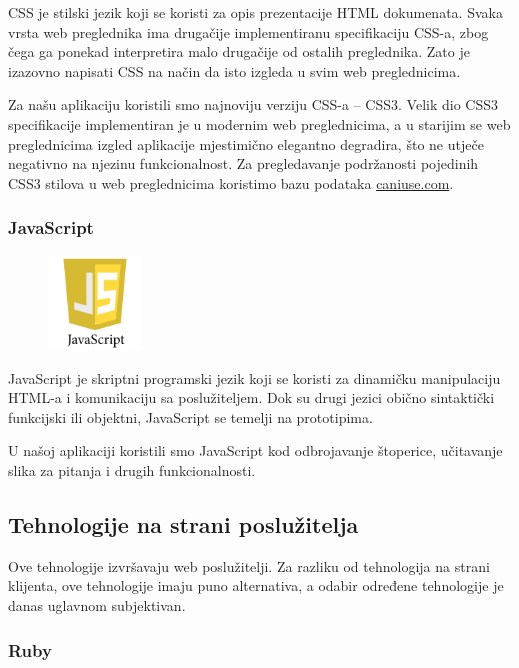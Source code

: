 \documentclass[11pt]{scrreprt}
\begin{document}
CSS je stilski jezik koji se koristi za opis prezentacije HTML dokumenata. Svaka
vrsta web preglednika ima drugačije implementiranu specifikaciju CSS-a, zbog
čega ga ponekad interpretira malo drugačije od ostalih preglednika. Zato je
izazovno napisati CSS na način da isto izgleda u svim web
preglednicima.\cite{css}

Za našu aplikaciju koristili smo najnoviju verziju CSS-a -- CSS3. Velik dio CSS3
specifikacije implementiran je u modernim web preglednicima, a u starijim se web
preglednicima izgled aplikacije mjestimično elegantno degradira, što ne utječe
negativno na njezinu funkcionalnost. Za pregledavanje podržanosti pojedinih CSS3
stilova u web preglednicima koristimo bazu podataka \url{caniuse.com}.

\subsubsection{JavaScript}

\begin{figure}
  \vspace{-10pt}
  \includegraphics[width=2.5cm]{logos/javascript}
  \vspace{-30pt}
\end{figure}

JavaScript je skriptni programski jezik koji se koristi za dinamičku
manipulaciju HTML-a i komunikaciju sa poslužiteljem. Dok su drugi jezici obično
sintaktički funkcijski ili objektni, JavaScript se temelji na
prototipima.\cite{js}

U našoj aplikaciji koristili smo JavaScript kod odbrojavanje štoperice,
učitavanje slika za pitanja i drugih funkcionalnosti.

\subsection{Tehnologije na strani poslužitelja}

Ove tehnologije izvršavaju web poslužitelji. Za razliku od tehnologija na
strani klijenta, ove tehnologije imaju puno alternativa, a odabir određene
tehnologije je danas uglavnom subjektivan.

\subsubsection{Ruby}
\end{document}
